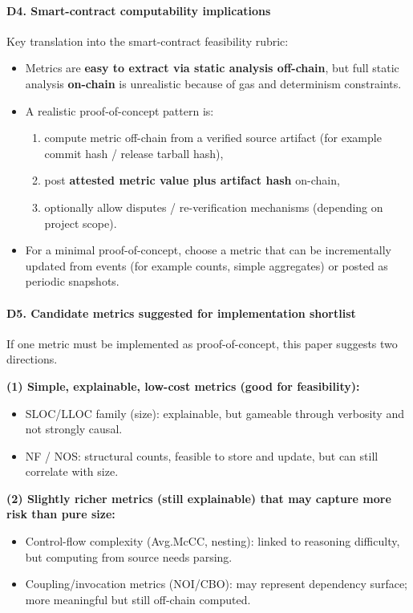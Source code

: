 \documentclass[11pt,a4paper]{article}
\begin{document}
\paragraph{D4. Smart-contract computability implications}
Key translation into the smart-contract feasibility rubric:
\begin{itemize}[leftmargin=*]
  \item Metrics are \textbf{easy to extract via static analysis off-chain}, but full static analysis \textbf{on-chain} is unrealistic because of gas and determinism constraints.
  \item A realistic proof-of-concept pattern is:
  \begin{enumerate}[leftmargin=*]
    \item compute metric off-chain from a verified source artifact (for example commit hash / release tarball hash),
    \item post \textbf{attested metric value plus artifact hash} on-chain,
    \item optionally allow disputes / re-verification mechanisms (depending on project scope).
  \end{enumerate}
  \item For a minimal proof-of-concept, choose a metric that can be incrementally updated from events (for example counts, simple aggregates) or posted as periodic snapshots.
\end{itemize}

\paragraph{D5. Candidate metrics suggested for implementation shortlist}
If one metric must be implemented as proof-of-concept, this paper suggests two directions.

\textbf{(1) Simple, explainable, low-cost metrics (good for feasibility):}
\begin{itemize}[leftmargin=*]
  \item SLOC/LLOC family (size): explainable, but gameable through verbosity and not strongly causal.
  \item NF / NOS: structural counts, feasible to store and update, but can still correlate with size.
\end{itemize}

\textbf{(2) Slightly richer metrics (still explainable) that may capture more risk than pure size:}
\begin{itemize}[leftmargin=*]
  \item Control-flow complexity (Avg.McCC, nesting): linked to reasoning difficulty, but computing from source needs parsing.
  \item Coupling/invocation metrics (NOI/CBO): may represent dependency surface; more meaningful but still off-chain computed.
\end{itemize}
\end{document}
